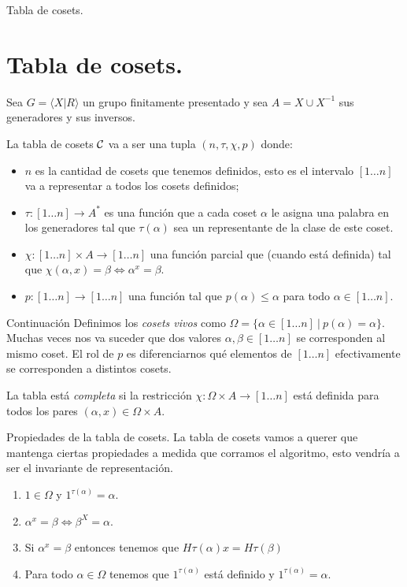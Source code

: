\documentclass[aspectratio=169, 9pt]{beamer}
\newcommand{\fp}{finitamente presentado }
\newcommand{\In}{[1 \dots n]}
\newcommand{\Co}{{\cal{C}}}
\begin{document}
\begin{frame}[fragile]{Tabla de cosets.}
	\section{Tabla de cosets.}
	Sea $G = \langle X | R \rangle$ un grupo \fp y sea $A = X \cup X^{-1}$ sus generadores y sus inversos.
	\pause
	
	La tabla de cosets $\Co $ va a ser una tupla $(n, \tau, \chi, p)$ donde:
	\pause
	\begin{itemize}
		\item $n$ es la cantidad de cosets que tenemos definidos, esto es el intervalo $\In$ va a representar a todos los cosets definidos;
		\pause
		\item $\tau : \In \to A^*$ es una función que a cada coset $\alpha$ le asigna una palabra en los generadores tal que $\tau(\alpha)$ sea un representante de la clase de este coset.
		\pause
		\item $\chi: \In \times A \to \In$ una función parcial que (cuando está definida) tal que $\chi(\alpha, x) = \beta \iff \alpha^x = \beta$.
		\pause
		\item $p: [1 \dots n] \to [1 \dots n]$ una función tal que $p(\alpha) \le \alpha$ para todo $\alpha \in [1\dots n]$.
	\end{itemize}
	
\end{frame}

\begin{frame}[fragile]{Continuación}
	Definimos los \emph{cosets vivos} como $\Omega = \{ \alpha \in \In  \ | \ p(\alpha) = \alpha \}$.
	Muchas veces nos va suceder que dos valores $\alpha, \beta \in \In$ se corresponden al mismo coset.
	El rol de $p$ es diferenciarnos qué elementos de $\In$ efectivamente se corresponden a distintos cosets.
	\pause
	\medskip
	
	
	
	La tabla está \emph{completa} si la restricción $\chi:\Omega \times A \to \In$ está definida para todos los pares $(\alpha, x) \in \Omega \times A$. 
\end{frame}

\begin{frame}[fragile]{Propiedades de la tabla de cosets.}
	La tabla de cosets vamos a querer que mantenga ciertas propiedades a medida que corramos el algoritmo, esto vendría a ser el invariante de representación.
	\pause
	
	
	
	\begin{enumerate}
		\item $1 \in \Omega$ y $1^{\tau(\alpha)} = \alpha$.
		\pause
		\item $\alpha^x = \beta \iff \beta^{X} = \alpha$.
		\pause
		\item Si $\alpha^x = \beta$ entonces tenemos que $H \tau(\alpha) x = H \tau(\beta)$
		\pause
		\item Para todo $\alpha \in \Omega$ tenemos que $1^{\tau(\alpha)}$ está definido y $1^{\tau(\alpha)} = \alpha$.
	\end{enumerate}
\end{frame}
\end{document}
